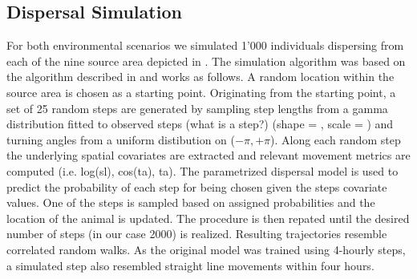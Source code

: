 \documentclass[abstract=on,10pt,a4paper,bibliography=totocnumbered]{article}
\begin{document}
\subsection{Dispersal Simulation}
For both environmental scenarios we simulated 1'000 individuals dispersing from
each of the nine source area depicted in . The simulation
algorithm was based on the algorithm described in  and works
as follows. A random location within the source area is chosen as a starting
point. Originating from the starting point, a set of 25 random steps are
generated by sampling step lengths from a gamma distribution fitted to observed
steps (what is a step?) (shape = , scale = ) and turning angles from a uniform
distibution on ($-\pi, +\pi$). Along each random step the underlying spatial
covariates are extracted and relevant movement metrics are computed (i.e.
log(sl), cos(ta), ta). The parametrized dispersal model is used to predict the
probability of each step for being chosen given the steps covariate values. One
of the steps is sampled based on assigned probabilities and the location of the
animal is updated. The procedure is then repated until the desired number of
steps (in our case 2000) is realized. Resulting trajectories resemble correlated
random walks. As the original model was trained using 4-hourly steps, a
simulated step also resembled straight line movements within four hours.

%
\end{document}
